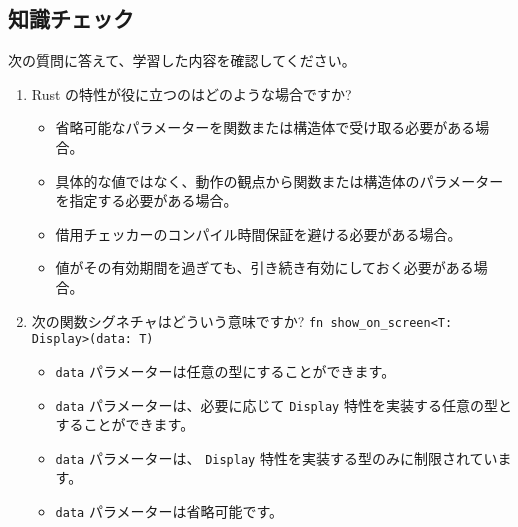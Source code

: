 \subsection{知識チェック}

次の質問に答えて、学習した内容を確認してください。

\begin{enumerate}
\item Rust の特性が役に立つのはどのような場合ですか?
\begin{itemize}
\item 省略可能なパラメーターを関数または構造体で受け取る必要がある場合。
\item 具体的な値ではなく、動作の観点から関数または構造体のパラメーターを指定する必要がある場合。
\item 借用チェッカーのコンパイル時間保証を避ける必要がある場合。
\item 値がその有効期間を過ぎても、引き続き有効にしておく必要がある場合。
\end{itemize}
\item 次の関数シグネチャはどういう意味ですか? \texttt{fn show\_on\_screen<T: Display>(data: T)}
\begin{itemize}
\item \texttt{data} パラメーターは任意の型にすることができます。
\item \texttt{data} パラメーターは、必要に応じて \texttt{Display} 特性を実装する任意の型とすることができます。
\item \texttt{data} パラメーターは、 \texttt{Display} 特性を実装する型のみに制限されています。
\item \texttt{data} パラメーターは省略可能です。
\end{itemize}
\end{enumerate}









